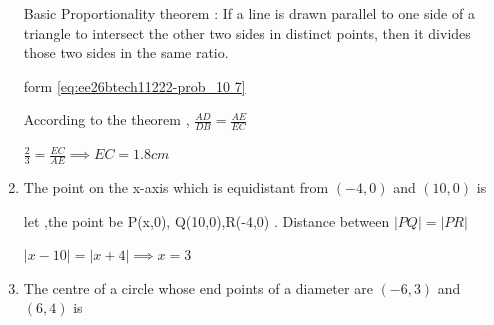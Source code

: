 \begin{enumerate}[label=\thesubsection.\arabic*, ref=\thesubsection.\theenumi]
\begin{center}
		
	\end{center}
	\solution
	
	Basic Proportionality theorem : If a line is drawn parallel to one side of a triangle to intersect the other two sides in distinct points, then it divides those two sides in the same ratio.
	
	form \eqref{eq:ee26btech11222-prob_10 7}
	
	According to the theorem , $\frac{AD}{DB}=\frac{AE}{EC}$
	
	$\frac{2}{3}= \frac{EC}{AE} \implies EC= 1.8cm $
	
	\item The point on the x-axis which is equidistant from $(-4, 0)$ and $(10, 0)$ is
	
	\begin{enumerate}
	\end{enumerate}	
	\solution
	
	let ,the point be P(x,0), Q(10,0),R(-4,0) . Distance between $\vert{}PQ\vert = \vert{}PR\vert{}$ 
	
	$\vert{}x-10\vert{} = \vert{}x+4\vert{} \implies x=3$
	
	\item 
	
	The centre of a circle whose end points of a diameter are $(-6, 3)$ and $(6, 4)$ is   
	\begin{enumerate}
		\begin{multicols}{4}
			\item $(8, -1)$   
			

\end{multicols}
\end{enumerate}
\end{enumerate}
